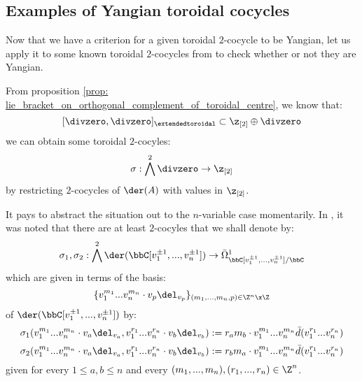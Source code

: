     \subsection{Examples of Yangian toroidal cocycles}
        Now that we have a criterion for a given toroidal $2$-cocycle to be Yangian, let us apply it to some known toroidal $2$-cocycles from \cite{billig_energy_momentum_tensor} to check whether or not they are Yangian. 
        \begin{example} \label{example: yangian_cocycles_(counter)_examples}
            From proposition \ref{prop: lie_bracket_on_orthogonal_complement_of_toroidal_centre}, we know that:
                $$[\divzero, \divzero]_{\extendedtoroidal} \subset \z_{[2]} \oplus \divzero$$
            we can obtain some toroidal $2$-cocyles:
                $$\sigma: \bigwedge^2 \divzero \to \z_{[2]}$$
            by restricting $2$-cocycles of $\der(A)$ with values in $\z_{[2]}$.

            It pays to abstract the situation out to the $n$-variable case momentarily. In \cite[p. 5, below Equation 1.3]{billig_energy_momentum_tensor}, it was noted that there are at least $2$-cocyles that we shall denote by:
                $$\sigma_1, \sigma_2: \bigwedge^2 \der(\bbC[v_1^{\pm 1}, ..., v_n^{\pm 1}]) \to \bar{\Omega}^1_{\bbC[v_1^{\pm 1}, ..., v_n^{\pm 1}]/\bbC}$$
            which are given in terms of the basis:
                $$\{ v_1^{m_1} ... v_n^{m_n} \cdot v_p \del_{v_p} \}_{(m_1, ..., m_n, p) \in \Z^n \x \Z}$$
            of $\der(\bbC[v_1^{\pm 1}, ..., v_n^{\pm 1}])$ by:
                $$\sigma_1(v_1^{m_1} ... v_n^{m_n} \cdot v_a \del_{v_a}, v_1^{r_1} ... v_n^{r_n} \cdot v_b \del_{v_b}) := r_a m_b \cdot v_1^{m_1} ... v_n^{m_n} \bar{d}( v_1^{r_1} ... v_n^{r_n} )$$
                $$\sigma_2(v_1^{m_1} ... v_n^{m_n} \cdot v_a \del_{v_a}, v_1^{r_1} ... v_n^{r_n} \cdot v_b \del_{v_b}) := r_b m_a \cdot v_1^{m_1} ... v_n^{m_n} \bar{d}( v_1^{r_1} ... v_n^{r_n} )$$
            given for every $1 \leq a, b \leq n$ and every $(m_1, ..., m_n), (r_1, ..., r_n) \in \Z^n$. 


\end{example}
